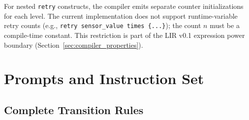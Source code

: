 \documentclass[a4paper,fleqn,longmktitle]{cas-dc}
\begin{document}
For nested \texttt{retry} constructs, the compiler emits separate counter initializations for each level. The current implementation does not support runtime-variable retry counts (e.g., \texttt{retry sensor\_value times \{...\}}); the count $n$ must be a compile-time constant. This restriction is part of the LIR v0.1 expression power boundary (Section~\ref{sec:compiler_properties}).

\section{Prompts and Instruction Set}
\label{app:b}

\subsection{Complete Transition Rules}
\label{app:rules}
\end{document}
